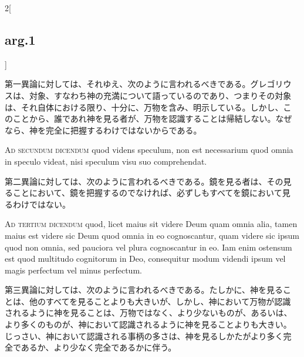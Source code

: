 \documentclass[paper=a4paper,fontsize=10pt,jafontsize=9pt,titlepage]{jlreq}
\begin{document}
\begin{paracol}{2}[\subsection{arg.1}]
\switchcolumn

第一異論に対しては、それゆえ、次のように言われるべきである。グレゴリウ
スは、対象、すなわち神の充満について語っているのであり、つまりその対象
は、それ自体における限り、十分に、万物を含み、明示している。しかし、こ
のことから、誰であれ神を見る者が、万物を認識することは帰結しない。なぜ
なら、神を完全に把握するわけではないからである。

\switchcolumn*[\subsection{ad.2}]

{\scshape  Ad secundum dicendum} quod videns speculum, non est
 necessarium quod omnia in speculo videat, nisi speculum visu suo
 comprehendat.

\switchcolumn

第二異論に対しては、次のように言われるべきである。鏡を見る者は、その見
ることにおいて、鏡を把握するのでなければ、必ずしもすべてを鏡において見
るわけではない。

\switchcolumn*[\subsection{ad.3}]

{\scshape  Ad tertium dicendum} quod, licet maius sit videre Deum quam
 omnia alia, tamen maius est videre sic Deum quod omnia in eo
 cognoscantur, quam videre sic ipsum quod non omnia, sed pauciora vel
 plura cognoscantur in eo. Iam enim ostensum est quod multitudo
 cognitorum in Deo, consequitur modum videndi ipsum vel magis perfectum
 vel minus perfectum.

\switchcolumn

第三異論に対しては、次のように言われるべきである。たしかに、神を見るこ
とは、他のすべてを見ることよりも大きいが、しかし、神において万物が認識
されるように神を見ることは、万物ではなく、より少ないものが、あるいは、
より多くのものが、神において認識されるように神を見ることよりも大きい。
じっさい、神において認識される事柄の多さは、神を見るしかたがより多く完
全であるか、より少なく完全であるかに伴う。

\switchcolumn*[\subsection{ad.4}]


\end{paracol}
\end{document}
